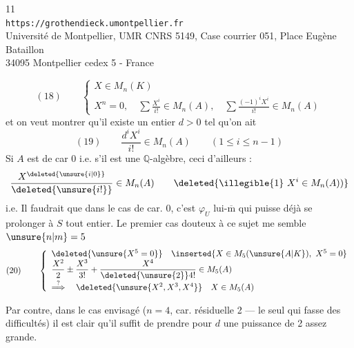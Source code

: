 \begin{center}
\small
11\\
\texttt{https://grothendieck.umontpellier.fr}\\
Université de Montpellier, UMR CNRS 5149, Case courrier 051, Place Eugène Bataillon\\
34095 Montpellier cedex 5 - France
\end{center}
\[
(18)\qquad
\left\{\begin{array}{l}
X\in M_n(K)\\
X^n=0,\quad\displaystyle\sum\frac{X^i}{i!}\in M_n(A),\quad
\displaystyle\sum\frac{(-1)^iX^i}{i!}\in M_n(A)
\end{array}\right.
\]
et on veut montrer qu'il existe un entier $d>0$ tel qu'on ait
\[
(19)\qquad\frac{d^iX^i}{i!}\in M_n(A)\qquad(1\leq i\leq n-1)
\]
Si $A$ est de car 0 i.e. s'il est une $\mathbb Q$-algèbre, ceci   d'ailleurs :
\[
\frac{X^{\deleted{\unsure{i|0}}}}{\deleted{\unsure{i!}}}\in M_n(A)
\qquad\deleted{\text{\illegible{1}}\ X^i\in M_n(A))}
\]
i.e. Il faudrait que dans le cas de car. 0, c'est $\varphi_U$ lui-$\overline{\mathrm m}$ qui puisse déjà se prolonger à $S$ tout entier. Le premier cas douteux à ce sujet me semble $\unsure{n|m}=5$
\[
(20)\qquad\left\{\begin{array}{l}
\deleted{\unsure{X^5=0}}\quad\inserted{X\in M_5(\unsure{A|K}),\ X^5=0}\\
\displaystyle\frac{X^2}{2}\pm\frac{X^3}{3!}+\frac{X^4}{\deleted{\unsure{2}}4!}\in M_5(A)\\[3pt]
\overset{?}{\Longrightarrow}\quad\deleted{\unsure{X^2,X^3,X^4}}\quad X\in M_5(A)
\end{array}\right.
\]

Par contre, dans le cas envisagé  ($n=4$, car. résiduelle 2 --- le seul qui fasse des difficultés) il est clair qu'il suffit de prendre pour $d$ une puissance de 2 assez grande.

